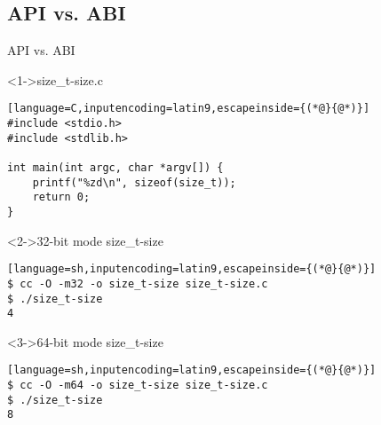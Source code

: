 \documentclass[ngerman,xcolor={table,dvipsnames},smaller,compress,hyperref={bookmarks,colorlinks}]{beamer}%
\begin{document}
\subsection{API vs. ABI}

\begin{frame}[fragile]{API vs. ABI}
\begin{block}<1->{size\_t-size.c}
\scriptsize
\begin{lstlisting}[language=C,inputencoding=latin9,escapeinside={(*@}{@*)}]
#include <stdio.h>
#include <stdlib.h>

int main(int argc, char *argv[]) {
    printf("%zd\n", sizeof(size_t));
    return 0;
}
\end{lstlisting}
\end{block}

\begin{block}<2->{32-bit mode size\_t-size}
\scriptsize
\begin{lstlisting}[language=sh,inputencoding=latin9,escapeinside={(*@}{@*)}]
$ cc -O -m32 -o size_t-size size_t-size.c
$ ./size_t-size
4
\end{lstlisting}
\end{block}

\begin{block}<3->{64-bit mode size\_t-size}
\scriptsize
\begin{lstlisting}[language=sh,inputencoding=latin9,escapeinside={(*@}{@*)}]
$ cc -O -m64 -o size_t-size size_t-size.c
$ ./size_t-size
8
\end{lstlisting}
\end{block}

\end{frame}
\end{document}
